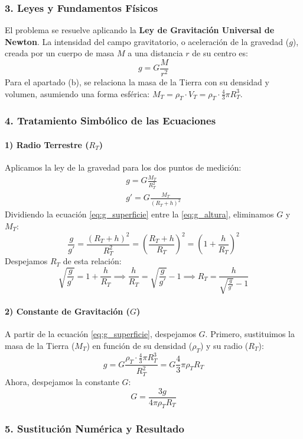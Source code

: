 \subsubsection*{3. Leyes y Fundamentos Físicos}
El problema se resuelve aplicando la \textbf{Ley de Gravitación Universal de Newton}. La intensidad del campo gravitatorio, o aceleración de la gravedad ($g$), creada por un cuerpo de masa $M$ a una distancia $r$ de su centro es:
$$g = G \frac{M}{r^2}$$
Para el apartado (b), se relaciona la masa de la Tierra con su densidad y volumen, asumiendo una forma esférica: $M_T = \rho_T \cdot V_T = \rho_T \cdot \frac{4}{3}\pi R_T^3$.

\subsubsection*{4. Tratamiento Simbólico de las Ecuaciones}
\paragraph*{1) Radio Terrestre ($R_T$)}
Aplicamos la ley de la gravedad para los dos puntos de medición:
\begin{gather}
    g = G \frac{M_T}{R_T^2} \label{eq:g_superficie} \\
    g' = G \frac{M_T}{(R_T + h)^2} \label{eq:g_altura}
\end{gather}
Dividiendo la ecuación \eqref{eq:g_superficie} entre la \eqref{eq:g_altura}, eliminamos $G$ y $M_T$:
$$\frac{g}{g'} = \frac{(R_T + h)^2}{R_T^2} = \left(\frac{R_T + h}{R_T}\right)^2 = \left(1 + \frac{h}{R_T}\right)^2$$
Despejamos $R_T$ de esta relación:
$$\sqrt{\frac{g}{g'}} = 1 + \frac{h}{R_T} \implies \frac{h}{R_T} = \sqrt{\frac{g}{g'}} - 1 \implies R_T = \frac{h}{\sqrt{\frac{g}{g'}} - 1}$$

\paragraph*{2) Constante de Gravitación ($G$)}
A partir de la ecuación \eqref{eq:g_superficie}, despejamos $G$. Primero, sustituimos la masa de la Tierra ($M_T$) en función de su densidad ($\rho_T$) y su radio ($R_T$):
$$g = G \frac{\rho_T \cdot \frac{4}{3}\pi R_T^3}{R_T^2} = G \frac{4}{3}\pi \rho_T R_T$$
Ahora, despejamos la constante $G$:
$$G = \frac{3g}{4\pi \rho_T R_T}$$

\subsubsection*{5. Sustitución Numérica y Resultado}
